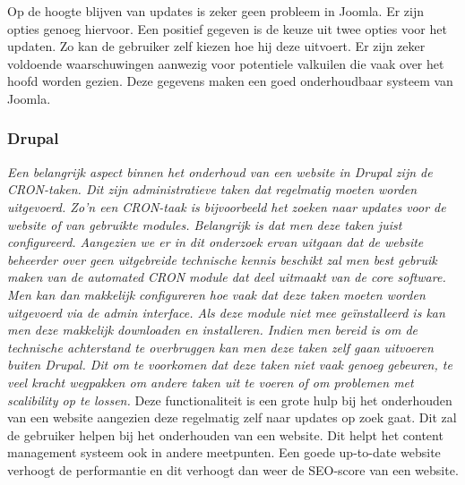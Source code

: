 Op de hoogte blijven van updates is zeker geen probleem in Joomla. Er zijn opties genoeg hiervoor. Een positief gegeven is de keuze uit twee opties voor het updaten. Zo kan de gebruiker zelf kiezen hoe hij deze uitvoert. Er zijn zeker voldoende waarschuwingen aanwezig voor potentiele valkuilen die vaak over het hoofd worden gezien. Deze gegevens maken een goed onderhoudbaar systeem van Joomla.
\subsubsection{Drupal}
\textit{Een belangrijk aspect binnen het onderhoud van een website in Drupal zijn de CRON-taken. Dit zijn administratieve taken dat regelmatig moeten worden uitgevoerd. Zo'n een CRON-taak is bijvoorbeeld het zoeken naar updates voor de website of van gebruikte modules. Belangrijk is dat men deze taken juist configureerd. Aangezien we er in dit onderzoek ervan uitgaan dat de website beheerder over geen uitgebreide technische kennis beschikt zal men best gebruik maken van de automated CRON module dat deel uitmaakt van de core software. Men kan dan makkelijk configureren hoe vaak dat deze taken moeten worden uitgevoerd via de admin interface. Als deze module niet mee geïnstalleerd is kan men deze makkelijk downloaden en installeren. Indien men bereid is om de technische achterstand te overbruggen kan men deze taken zelf gaan uitvoeren buiten Drupal. Dit om te voorkomen dat deze taken niet vaak genoeg gebeuren, te veel kracht wegpakken om andere taken uit te voeren of om problemen met scalibility op te lossen.}\autocite{DrupalAssociation2015-2017a} Deze functionaliteit is een grote hulp bij het onderhouden van een website aangezien deze regelmatig zelf naar updates op zoek gaat. Dit zal de gebruiker helpen bij het onderhouden van een website. Dit helpt het content management systeem ook in andere meetpunten. Een goede up-to-date website verhoogt de performantie en dit verhoogt dan weer de SEO-score van een website.


